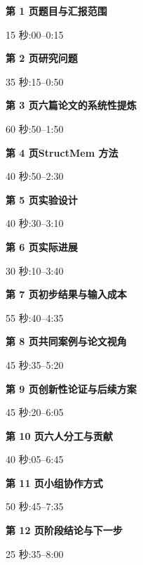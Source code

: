 \documentclass[UTF8,fontset=fandol,12pt]{ctexart}
\newcommand{\talk}[4]{%
  {\color{accent}\large\bfseries 第 #1 页\quad #2}\par
  {\small #3}\par\vspace{2mm}
  #4\par}
\begin{document}
\newpage
\talk{1}{题目与汇报范围}{15 秒:00--0:15}{\speechOne}

\vspace{7mm}
\talk{2}{研究问题}{35 秒:15--0:50}{\speechTwo}

\newpage
\talk{3}{六篇论文的系统性提炼}{60 秒:50--1:50}{\speechSynthesis}

\vspace{7mm}
\talk{4}{StructMem 方法}{40 秒:50--2:30}{\speechThree}

\newpage
\talk{5}{实验设计}{40 秒:30--3:10}{\speechFour}

\vspace{7mm}
\talk{6}{实际进展}{30 秒:10--3:40}{\speechFive}

\newpage
\talk{7}{初步结果与输入成本}{55 秒:40--4:35}{\speechSix}

\vspace{7mm}
\talk{8}{共同案例与论文视角}{45 秒:35--5:20}{\speechSeven}

\newpage
\talk{9}{创新性论证与后续方案}{45 秒:20--6:05}{\speechEight}

\vspace{7mm}
\talk{10}{六人分工与贡献}{40 秒:05--6:45}{\speechNine}

\newpage
\talk{11}{小组协作方式}{50 秒:45--7:35}{\speechCollaboration}

\vspace{7mm}
\talk{12}{阶段结论与下一步}{25 秒:35--8:00}{\speechTen}
\end{document}

